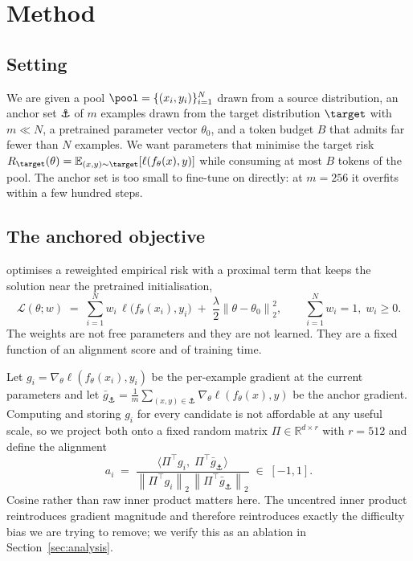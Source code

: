 \section{Method}
\label{sec:method}

\subsection{Setting}

We are given a pool $\pool = \{(x_i, y_i)\}_{i=1}^{N}$ drawn from a source
distribution, an anchor set $\anchor$ of $m$ examples drawn from the target
distribution $\target$ with $m \ll N$, a pretrained parameter vector
$\theta_0$, and a token budget $B$ that admits far fewer than $N$ examples. We
want parameters that minimise the target risk
$R_{\target}(\theta) = \mathbb{E}_{(x,y) \sim \target}[\ell(f_\theta(x), y)]$
while consuming at most $B$ tokens of the pool. The anchor set is too small to
fine-tune on directly: at $m = 256$ it overfits within a few hundred steps.

\subsection{The anchored objective}

\method{} optimises a reweighted empirical risk with a proximal term that keeps
the solution near the pretrained initialisation,
\begin{equation}
  \label{eq:objective}
  \mathcal{L}(\theta; w) \;=\; \sum_{i=1}^{N} w_i \,
    \ell\bigl(f_\theta(x_i), y_i\bigr)
    \;+\; \frac{\lambda}{2} \left\lVert \theta - \theta_0 \right\rVert_2^2 ,
  \qquad \sum_{i=1}^{N} w_i = 1, \; w_i \ge 0 .
\end{equation}
The weights are not free parameters and they are not learned. They are a fixed
function of an alignment score and of training time.

Let $g_i = \nabla_\theta \ell(f_{\theta}(x_i), y_i)$ be the per-example
gradient at the current parameters and let
$\bar{g}_{\anchor} = \frac{1}{m} \sum_{(x,y) \in \anchor} \nabla_\theta
\ell(f_\theta(x), y)$ be the anchor gradient. Computing and storing $g_i$ for
every candidate is not affordable at any useful scale, so we project both onto
a fixed random matrix $\Pi \in \mathbb{R}^{d \times r}$ with $r = 512$ and
define the alignment
\begin{equation}
  \label{eq:alignment}
  a_i \;=\;
  \frac{\bigl\langle \Pi^{\top} g_i, \; \Pi^{\top} \bar{g}_{\anchor} \bigr\rangle}
       {\left\lVert \Pi^{\top} g_i \right\rVert_2 \,
        \left\lVert \Pi^{\top} \bar{g}_{\anchor} \right\rVert_2} \; \in \; [-1, 1] .
\end{equation}
Cosine rather than raw inner product matters here. The uncentred inner product
reintroduces gradient magnitude and therefore reintroduces exactly the
difficulty bias we are trying to remove; we verify this as an ablation in
Section~\ref{sec:analysis}.

